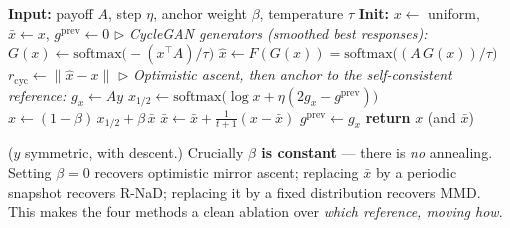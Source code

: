 \documentclass[10pt,twocolumn]{article}
\theoremstyle{plain}
\theoremstyle{remark}
\newcommand{\xbar}{\bar{x}}
\newcommand{\softmax}{\mathrm{softmax}}
\begin{document}
\begin{algorithm}[t]
\caption{GARIP (matrix-game form, row player; column $y$ symmetric)}
\label{alg:garip}
\begin{algorithmic}[1]
\State \textbf{Input:} payoff $A$, step $\eta$, anchor weight $\beta$, temperature $\tau$
\State \textbf{Init:} $x \gets$ uniform, $\xbar \gets x$, $g^{\text{prev}} \gets 0$
  \Statex \quad$\triangleright$ \emph{CycleGAN generators (smoothed best responses):}
  \State $G(x) \gets \softmax\!\big(\!-(x^\top A)/\tau\big)$ 
  \State $\hat{x} \gets F(G(x)) = \softmax\!\big((A\,G(x))/\tau\big)$ 
  \State $r_{\text{cyc}} \gets \lVert \hat{x} - x\rVert$ 
  \Statex \quad$\triangleright$ \emph{Optimistic ascent, then anchor to the self-consistent reference:}
  \State $g_x \gets A y$ 
  \State $x_{1/2} \gets \softmax\!\big(\log x + \eta(2 g_x - g^{\text{prev}})\big)$ 
  \State $x \gets (1-\beta)\, x_{1/2} + \beta\, \xbar$ 
  \State $\xbar \gets \xbar + \tfrac{1}{t+1}(x - \xbar)$ \Comment{$\xbar$: fixed point of $F\!\circ\!G$}
  \State $g^{\text{prev}} \gets g_x$
\EndFor
\State \textbf{return} $x$ (and $\xbar$)
\end{algorithmic}
\end{algorithm}

($y$ symmetric, with descent.) Crucially \textbf{$\beta$ is constant} --- there
is \emph{no} annealing. Setting $\beta=0$ recovers optimistic mirror ascent;
replacing $\xbar$ by a periodic snapshot recovers R-NaD; replacing it by a fixed
distribution recovers MMD. This makes the four methods a clean ablation over
\emph{which reference, moving how}.
\end{document}
